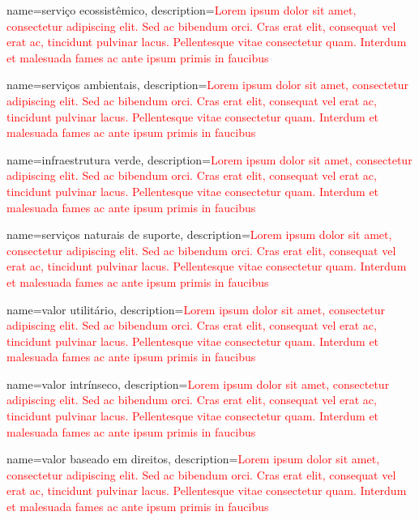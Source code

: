 {
	name=serviço ecossistêmico,
	description={\textcolor{red}{Lorem ipsum dolor sit amet, consectetur adipiscing elit. Sed ac bibendum orci. Cras erat elit, consequat vel erat ac, tincidunt pulvinar lacus. Pellentesque vitae consectetur quam. Interdum et malesuada fames ac ante ipsum primis in faucibus}}
}

{
	name=serviços ambientais,
	description={\textcolor{red}{Lorem ipsum dolor sit amet, consectetur adipiscing elit. Sed ac bibendum orci. Cras erat elit, consequat vel erat ac, tincidunt pulvinar lacus. Pellentesque vitae consectetur quam. Interdum et malesuada fames ac ante ipsum primis in faucibus}}
}

{
	name=infraestrutura verde,
	description={\textcolor{red}{Lorem ipsum dolor sit amet, consectetur adipiscing elit. Sed ac bibendum orci. Cras erat elit, consequat vel erat ac, tincidunt pulvinar lacus. Pellentesque vitae consectetur quam. Interdum et malesuada fames ac ante ipsum primis in faucibus}}
}

{
	name=serviços naturais de suporte,
	description={\textcolor{red}{Lorem ipsum dolor sit amet, consectetur adipiscing elit. Sed ac bibendum orci. Cras erat elit, consequat vel erat ac, tincidunt pulvinar lacus. Pellentesque vitae consectetur quam. Interdum et malesuada fames ac ante ipsum primis in faucibus}}
}

{
	name=valor utilitário,
	description={\textcolor{red}{Lorem ipsum dolor sit amet, consectetur adipiscing elit. Sed ac bibendum orci. Cras erat elit, consequat vel erat ac, tincidunt pulvinar lacus. Pellentesque vitae consectetur quam. Interdum et malesuada fames ac ante ipsum primis in faucibus}}
}

{
	name=valor intrínseco,
	description={\textcolor{red}{Lorem ipsum dolor sit amet, consectetur adipiscing elit. Sed ac bibendum orci. Cras erat elit, consequat vel erat ac, tincidunt pulvinar lacus. Pellentesque vitae consectetur quam. Interdum et malesuada fames ac ante ipsum primis in faucibus}}
}

{
	name=valor baseado em direitos,
	description={\textcolor{red}{Lorem ipsum dolor sit amet, consectetur adipiscing elit. Sed ac bibendum orci. Cras erat elit, consequat vel erat ac, tincidunt pulvinar lacus. Pellentesque vitae consectetur quam. Interdum et malesuada fames ac ante ipsum primis in faucibus}}
}

